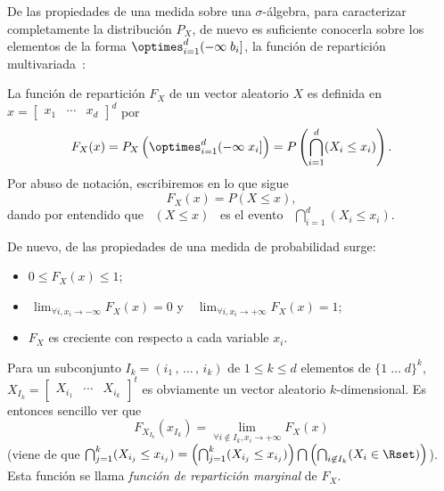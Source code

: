 De las propiedades de una medida sobre una $\sigma$-\'algebra, para caracterizar
completamente la  distribuci\'on $P_X$, de  nuevo es suficiente  conocerla sobre
los elementos de la forma $\displaystyle \optimes_{i=1}^d (-\infty \; b_i]$, \ie
la  funci\'on  de  repartici\'on multivariada~\cite{AshDol99,  AthLah06,  Coh13,
  Bre88, HogMck13}:
%
\begin{definicion}
\label{Def:MP:FuncionReparticionMultivariada}
%
  La funci\'on de repartici\'on $F_X$ de  un vector aleatorio $X$ es definida en
  $x = \begin{bmatrix} x_1 & \cdots & x_d \end{bmatrix}^d$ por
  \[
  F_X(x) =  P_X\left( \optimes_{i=1}^d (-\infty \; x_i]  \right) = P\left(
    \bigcap_{i=1}^d (X_i \le x_i) \right).
  \]
  Por abuso de notaci\'on, escribiremos en lo que sigue
  \[
  F_X(x) = P(X \le x),
  \]
  dando  por entendido  que  \  $(X \le  x)$  \ es  el  evento \  $\displaystyle
  \bigcap_{i=1}^d (X_i \le x_i)$.
\end{definicion}
%
De nuevo, de las propiedades de una medida de probabilidad surge:
%
\begin{itemize}
\item $0 \le F_X(x) \le 1$;
%
\item  $\displaystyle \,  \lim_{\forall i,  x_i  \to -\infty}  F_X(x) =  0$ y  \
  $\displaystyle \, \lim_{\forall i, x_i \to +\infty} F_X(x) = 1$;
%
\item $F_X$ es creciente con respecto a cada variable $x_i$.
\end{itemize}
%
Para un subconjunto $I_k = (i_1 \, , \,  \ldots \, , \, i_k)$ de $1 \le k \le d$
elementos de  $\{ 1 \; \ldots \;  d \}^k$, $X_{I_k} =  \begin{bmatrix} X_{i_1} &
  \cdots   &   X_{i_k}\end{bmatrix}^t$  es   obviamente   un  vector   aleatorio
$k$-dimensional. Es entonces sencillo ver que
%
\[
F_{X_{I_k}}(x_{I_k}) = \lim_{\forall i \not\in I_k, x_i \to +\infty} F_X(x)
\label{Pagina:MP:MarginalesF}
\]
%
\Big(viene de  que $\bigcap_{j=1}^k (X_{i_j}  \le x_{i_j}) =  \left( \bigcap_{j=1}^k
  (X_{i_j} \le x_{i_j}) \right) \bigcap  \left( \bigcap_{i \not\in I_k} (X_i \in
  \Rset)  \right)$\Big). Esta  funci\'on se llama {\it  funci\'on  de repartici\'on
  marginal} de $F_X$.

